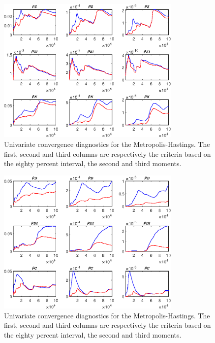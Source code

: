 \begin{figure}[H]
\centering 
\includegraphics[width=0.80\textwidth]{BRS_growth_util/Output/BRS_growth_util_udiag5}
\caption{Univariate convergence diagnostics for the Metropolis-Hastings.
The first, second and third columns are respectively the criteria based on
the eighty percent interval, the second and third moments.}\label{Fig:UnivariateDiagnostics:5}
\end{figure}

\begin{figure}[H]
\centering 
\includegraphics[width=0.80\textwidth]{BRS_growth_util/Output/BRS_growth_util_udiag6}
\caption{Univariate convergence diagnostics for the Metropolis-Hastings.
The first, second and third columns are respectively the criteria based on
the eighty percent interval, the second and third moments.}\label{Fig:UnivariateDiagnostics:6}
\end{figure}

